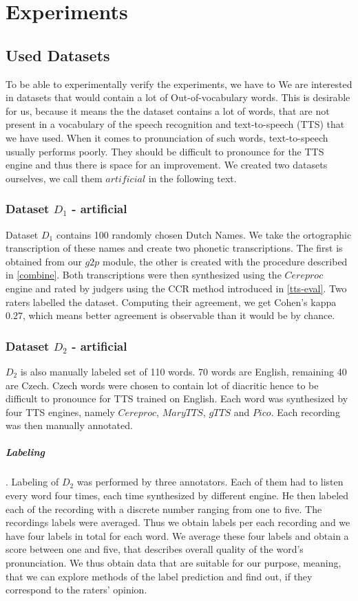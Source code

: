 \chapter{Experiments}
\section{Used Datasets}
\label{data-desc}
To be able to experimentally verify the experiments, we have to  
We are interested in datasets that would contain a lot of Out-of-vocabulary words.
This is desirable for us, because it means the the dataset contains a lot of words, that are not present in a vocabulary of the speech recognition and text-to-speech (TTS) that we have used.
When it comes to pronunciation of such words, text-to-speech usually performs poorly.
They should be difficult to pronounce for the TTS engine and thus there is space for an improvement.
We created two datasets ourselves, we call them $artificial$ in the following text.
\subsection{Dataset \textbf{$D_1$} - artificial}
Dataset $D_1$ contains 100 randomly chosen Dutch Names.
We take the ortographic transcription of these names and create two phonetic transcriptions.
The first is obtained from our $g2p$ module, the other is created with the procedure described in \ref{combine}.
Both transcriptions were then synthesized using the $Cereproc$ engine and rated by judgers using the CCR method introduced in \ref{tts-eval}.
Two raters labelled the dataset.
Computing their agreement, we get Cohen's kappa $0.27$, which means better agreement is observable than it would be by chance.
\subsection{Dataset \textbf{$D_2$} - artificial}
$D_2$ is also manually labeled set of 110 words.
70 words are English, remaining 40 are Czech.
Czech words were chosen to contain lot of diacritic hence to be difficult to pronounce for TTS trained on English.
Each word was synthesized by four TTS engines, namely $Cereproc$, $MaryTTS$, $gTTS$ and $Pico$.
Each recording was then manually annotated.
\paragraph{Labeling}. Labeling of $D_2$  was performed by three annotators. Each of them had to listen every word four times, each time synthesized by different engine. He then labeled each of the recording with a discrete number ranging from one to five. The recordings labels were averaged. Thus we obtain labels per each recording and we have four labels in total for each word. We average these four labels and obtain a score between one and five, that describes overall quality of the word's pronunciation.
We thus obtain data that are suitable for our purpose, meaning, that we can explore methods of the label prediction and find out, if they correspond to the raters' opinion.
